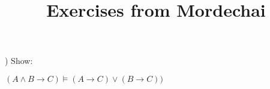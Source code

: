 \documentclass[letterpaper]{article}
\title{Exercises from Mordechai}
\begin{document}
) Show:

$ (A\wedge B\rightarrow C)\vDash (A\rightarrow C)\vee (B\rightarrow C)) $
\end{document}
